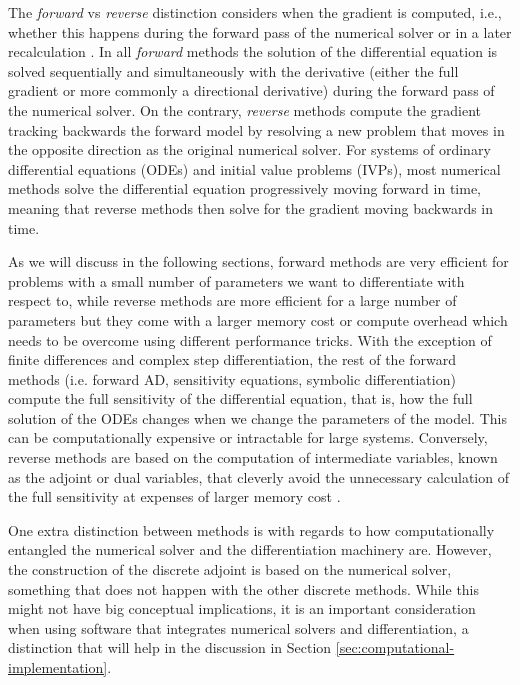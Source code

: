 The \textit{forward} vs \textit{reverse} distinction considers when the gradient is computed, i.e., whether this happens during the forward pass of the numerical solver or in a later recalculation \cite{Griewank:2008kh}. 
In all \textit{forward} methods the solution of the differential equation is solved sequentially and simultaneously with the derivative (either the full gradient or more commonly a directional derivative) during the forward pass of the numerical solver. 
On the contrary, \textit{reverse} methods compute the gradient tracking backwards the forward model by resolving a new problem that moves in the opposite direction as the original numerical solver. 
For systems of ordinary differential equations (ODEs) and initial value problems (IVPs), most numerical methods solve the differential equation progressively moving forward in time, meaning that reverse methods then solve for the gradient moving backwards in time. 

As we will discuss in the following sections, forward methods are very efficient for problems with a small number of parameters we want to differentiate with respect to, while reverse methods are more efficient for a large number of parameters but they come with a larger memory cost or compute overhead which needs to be overcome using different performance tricks. 
With the exception of finite differences and complex step differentiation, the rest of the forward methods (i.e. forward AD, sensitivity equations, symbolic differentiation) compute the full sensitivity of the differential equation, that is, how the full solution of the ODEs changes when we change the parameters of the model. 
This can be computationally expensive or intractable for large systems. 
Conversely, reverse methods are based on the computation of intermediate variables, known as the adjoint or dual variables, that cleverly avoid the unnecessary calculation of the full sensitivity at expenses of larger memory cost \cite{Givoli_2021}. 

One extra distinction between methods is with regards to how computationally entangled the numerical solver and the differentiation machinery are. 
However, the construction of the discrete adjoint is based on the numerical solver, something that does not happen with the other discrete methods. 
While this might not have big conceptual implications, it is an important consideration when using software that integrates numerical solvers and differentiation, a distinction that will help in the discussion in Section \ref{sec:computational-implementation}.

